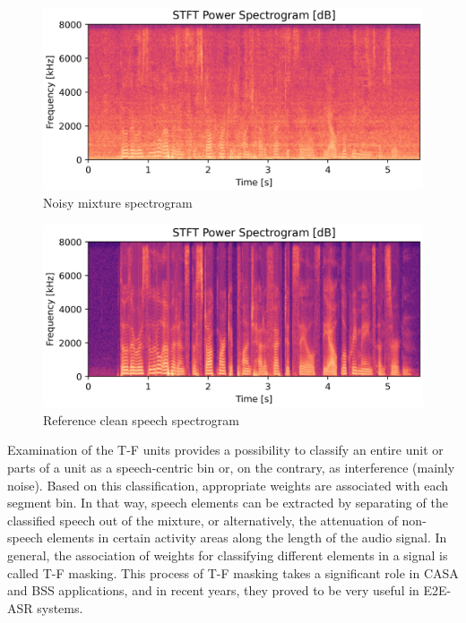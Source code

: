 \begin{figure}[H]
    \centering
    \includegraphics[width=\linewidth]{Features/images/noisy_specgram}
    \caption{Noisy mixture spectrogram}\label{fig:noisy_specgram}
\end{figure}
\begin{figure}[H]
    \centering
    \includegraphics[width=\linewidth]{Features/images/clean_specgram}
    \caption{Reference clean speech spectrogram}\label{fig:clean_specgram}
\end{figure}

Examination of the T-F units provides a 
possibility to classify an entire unit
or parts of a unit 
as a speech-centric bin or, on the contrary, 
as interference (mainly noise). 
Based on this classification, 
appropriate weights are associated with each segment bin.
In that way, speech elements can be extracted 
by separating of the classified speech 
out of the mixture, or alternatively, 
the attenuation of non-speech elements 
in certain activity areas 
along the length of the audio signal.
In general, the association of weights for classifying different
elements in a signal is called T-F masking. 
This process of T-F masking takes a 
significant role in CASA and BSS applications, 
and in recent years, they proved to be 
very useful in E2E-ASR systems.

